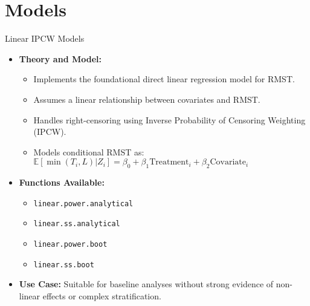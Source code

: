 \documentclass{beamer}
\begin{document}
\section*{Models}
\begin{frame}{Linear IPCW Models}
\begin{itemize}
    \item \textbf{Theory and Model:}
    \begin{itemize}
        \item Implements the foundational direct linear regression model for RMST.
        \item Assumes a linear relationship between covariates and RMST.
        \item Handles right-censoring using Inverse Probability of Censoring Weighting (IPCW).
        \item Models conditional RMST as: $\mathbb{E}[\min(T_i, L) | Z_i] = \beta_0 + \beta_1 \text{Treatment}_i + \beta_2 \text{Covariate}_{i}$
    \end{itemize}
    \item \textbf{Functions Available:}
    \begin{itemize}
        \item \texttt{linear.power.analytical}
        \item \texttt{linear.ss.analytical}
        \item \texttt{linear.power.boot}
        \item \texttt{linear.ss.boot}
    \end{itemize}
    \item \textbf{Use Case:} Suitable for baseline analyses without strong evidence of non-linear effects or complex stratification.
\end{itemize}
\end{frame}
\end{document}

